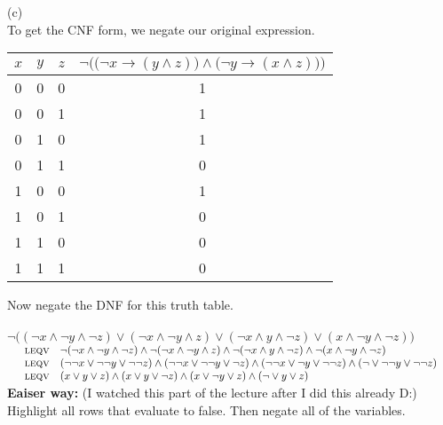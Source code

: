 \documentclass[12pt]{article}
\newcommand{\bigbracket}[1]{\big(#1\big)}
\begin{document}
\newpage
(c)\\
To get the CNF form, we negate our original expression.
\begin{center}
    \begin{tabular}{|c|c|c|| c|}
        \hline
        $x$ & $y$ & $z$ &$\neg \Big(\bigbracket{\neg x \to (y \wedge z)} \wedge \bigbracket{\neg y \to (x \wedge z)}\Big)$\\ 
        \hline \hline 
        \rowcolor{epicOrange}0&0&0&  1 \\   
        \rowcolor{epicOrange}0&0&1&  1 \\
        \rowcolor{epicOrange}0&1&0&  1 \\  
        0&1&1&  0 \\ 
        \hline 
        \rowcolor{epicOrange}1&0&0&  1 \\  
        1&0&1&  0 \\  
        1&1&0&  0 \\  
        1&1&1&  0 \\  
        \hline 
    \end{tabular}
\end{center}
Now negate the DNF for this truth table.
\\\\
$\neg\bigbracket{(\neg x \wedge \neg y \wedge \neg z) \vee (\neg x \wedge \neg y \wedge z) \vee (\neg x \wedge y \wedge \neg z) \vee (x \wedge \neg y \wedge \neg z)}$\\
{$\begin{array}{rc>{\displaystyle}ll}
    &\text{\textsc{leqv}}&
    \neg(\neg x \wedge \neg y \wedge \neg z) \wedge \neg(\neg x \wedge \neg y \wedge z) \wedge \neg(\neg x \wedge y \wedge \neg z) \wedge \neg(x \wedge \neg y \wedge \neg z)&\text{}\\
    &\text{\textsc{leqv}}&
    (\neg \neg x \vee \neg\neg y \vee \neg \neg z) \wedge (\neg\neg  x \vee \neg \neg y \vee \neg z) \wedge (\neg \neg x \vee \neg y \vee \neg \neg z) \wedge (\neg  \vee \neg \neg y \vee \neg \neg z)&\text{}\\
    &\text{\textsc{leqv}}&
    (x \vee  y \vee  z) \wedge (  x \vee  y \vee \neg z) \wedge ( x \vee \neg y \vee  z) \wedge (\neg  \vee  y \vee  z)&\text{}\\
    \end{array}$}
\\[50mm]
\textbf{Eaiser way:} (I watched this part of the lecture after I did this already D:)\\
Highlight all rows that evaluate to false. Then negate all of the variables. 
\end{document}
